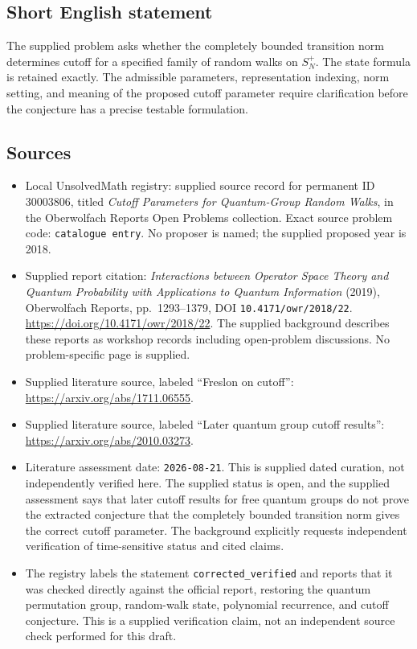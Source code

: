 \documentclass[11pt]{article}
\begin{document}
\subsection{Short English statement}
The supplied problem asks whether the completely bounded transition norm determines cutoff for a specified family of random walks on \(S_N^+\). The state formula is retained exactly. The admissible parameters, representation indexing, norm setting, and meaning of the proposed cutoff parameter require clarification before the conjecture has a precise testable formulation.
\subsection{Sources}
\begin{itemize}
\item Local UnsolvedMath registry: supplied source record for permanent ID \(30003806\), titled \emph{Cutoff Parameters for Quantum-Group Random Walks}, in the Oberwolfach Reports Open Problems collection. Exact source problem code: \texttt{catalogue entry}. No proposer is named; the supplied proposed year is 2018.
\item Supplied report citation: \emph{Interactions between Operator Space Theory and Quantum Probability with Applications to Quantum Information} (2019), Oberwolfach Reports, pp.\ 1293--1379, DOI \texttt{10.4171/owr/2018/22}. \url{https://doi.org/10.4171/owr/2018/22}. The supplied background describes these reports as workshop records including open-problem discussions. No problem-specific page is supplied.
\item Supplied literature source, labeled ``Freslon on cutoff'': \url{https://arxiv.org/abs/1711.06555}.
\item Supplied literature source, labeled ``Later quantum group cutoff results'': \url{https://arxiv.org/abs/2010.03273}.
\item Literature assessment date: \texttt{2026-08-21}. This is supplied dated curation, not independently verified here. The supplied status is open, and the supplied assessment says that later cutoff results for free quantum groups do not prove the extracted conjecture that the completely bounded transition norm gives the correct cutoff parameter. The background explicitly requests independent verification of time-sensitive status and cited claims.
\item The registry labels the statement \texttt{corrected\_verified} and reports that it was checked directly against the official report, restoring the quantum permutation group, random-walk state, polynomial recurrence, and cutoff conjecture. This is a supplied verification claim, not an independent source check performed for this draft.
\end{itemize}
\end{document}
